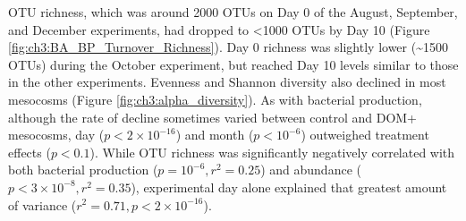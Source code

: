 OTU richness, which was around 2000 OTUs on Day 0 of the August, September, and December experiments, had dropped to {\textless}1000 OTUs by Day 10 (Figure \ref{fig:ch3:BA_BP_Turnover_Richness}). Day 0 richness was slightly lower (\textasciitilde{}1500 OTUs) during the October experiment, but reached Day 10 levels similar to those in the other experiments. Evenness and Shannon diversity also declined in most mesocosms (Figure \ref{fig:ch3:alpha_diversity}). As with bacterial production, although the rate of decline sometimes varied between control and DOM+ mesocosms, day ($p < 2 \times 10^{-16}$) and month ($p < 10^{-6}$) outweighed treatment effects ($p < 0.1$). While OTU richness was significantly negatively correlated with both bacterial production ($p = 10^{-6}, r^{2}=0.25$) and abundance ($p < 3 \times 10^{-8}, r^{2}=0.35$), experimental day alone explained that greatest amount of variance ($r^{2}=0.71, p < 2 \times 10^{-16}$). 

